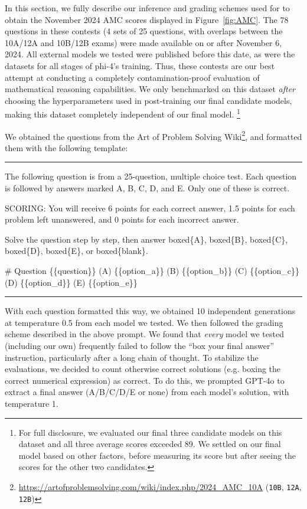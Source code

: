 \documentclass[11pt]{article}
\newcommand{\modelwithoutspace}{\textsf{phi-4}}
\begin{document}
In this section, we fully describe our inference and grading schemes used for to obtain the November 2024 AMC scores displayed in Figure~\ref{fig:AMC}.
The 78 questions in these contests (4 sets of 25 questions, with overlaps between the 10A/12A and 10B/12B exams) were made available on or after November 6, 2024. All external models we tested were published before this date, as were the datasets for all stages of \modelwithoutspace's training. Thus, these contests are our best attempt at conducting a completely contamination-proof evaluation of mathematical reasoning capabilities.
We only benchmarked on this dataset \emph{after} choosing the hyperparameters used in post-training our final candidate models, making this dataset completely independent of our final model.
\footnote{For full disclosure, we evaluated our final three candidate models on this dataset and all three average scores exceeded 89.  We settled on our final model based on other factors, before measuring its score but after seeing the scores for the other two candidates.}


We obtained the questions from the Art of Problem Solving Wiki\footnote{\url{https://artofproblemsolving.com/wiki/index.php/2024_AMC_10A} (\texttt{10B}, \texttt{12A}, \texttt{12B})}, and formatted them with the following template:

\par\noindent\rule{\textwidth}{0.5pt}
\begin{HighlightVerbatim}
The following question is from a 25-question, multiple choice test. Each question is followed by answers marked A, B, C, D, and E.  Only one of these is correct.

SCORING: You will receive 6 points for each correct answer, 1.5 points for each problem left unanswered, and 0 points for each incorrect answer.

Solve the question step by step, then answer boxed\{A\}, boxed\{B\}, boxed\{C\}, boxed\{D\}, boxed\{E\}, or boxed\{blank\}.

# Question
\{\{question\}\}
(A) \{\{option_a\}\}
(B) \{\{option_b\}\}
(C) \{\{option_c\}\}
(D) \{\{option_d\}\}
(E) \{\{option_e\}\}
\end{HighlightVerbatim}
\par\noindent\rule{\textwidth}{0.5pt}

With each question formatted this way, we obtained 10 independent generations at temperature 0.5 from each model we tested. We then followed the grading scheme described in the above prompt. We found that \emph{every} model we tested (including our own) frequently failed to follow the ``box your final answer'' instruction, particularly after a long chain of thought. To stabilize the evaluations, we decided to count otherwise correct solutions (e.g. boxing the correct numerical expression) as correct. To do this, we prompted GPT-4o to extract a final answer (A/B/C/D/E or none) from each model's solution, with temperature 1.
\end{document}
